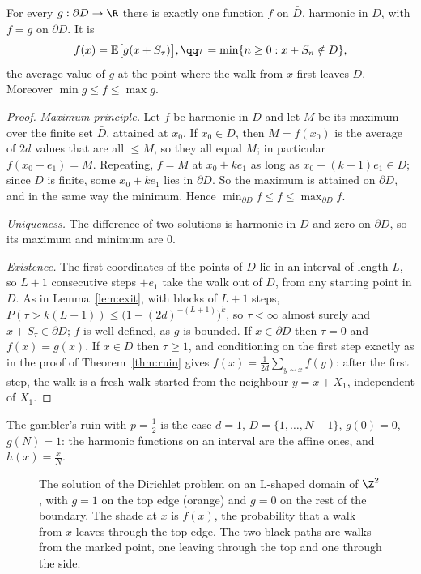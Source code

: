 \begin{theorem}\label{thm:dirichlet}
For every $g:\partial D\to\R$ there is exactly one function $f$ on $\bar D$, harmonic in $D$, with $f=g$ on $\partial D$. It is
\[
\begin{gathered}f(x)=\mathbb E\bigl[g(x+S_\tau)\bigr],\qq\tau=\min\{n\ge0:x+S_n\notin D\},\end{gathered}
\]
the average value of $g$ at the point where the walk from $x$ first leaves $D$. Moreover $\min g\le f\le\max g$.
\end{theorem}
\begin{proof}
\emph{Maximum principle.} Let $f$ be harmonic in $D$ and let $M$ be its maximum over the finite set $\bar D$, attained at $x_0$. If $x_0\in D$,
then $M=f(x_0)$ is the average of $2d$ values that are all $\le M$, so they all equal $M$; in particular $f(x_0+e_1)=M$. Repeating, $f=M$ at
$x_0+ke_1$ as long as $x_0+(k-1)e_1\in D$; since $D$ is finite, some $x_0+ke_1$ lies in $\partial D$. So the maximum is attained on $\partial D$, and in the same way
the minimum. Hence $\min_{\partial D}f\le f\le\max_{\partial D}f$.

\emph{Uniqueness.} The difference of two solutions is harmonic in $D$ and zero on $\partial D$, so its maximum and minimum are $0$.

\emph{Existence.} The first coordinates of the points of $D$ lie in an interval of length $L$, so $L+1$ consecutive steps $+e_1$ take the walk
out of $D$, from any starting point in $D$. As in Lemma~\ref{lem:exit}, with blocks of $L+1$ steps, $P(\tau>k(L+1))\le\bigl(1-(2d)^{-(L+1)}\bigr)^k$, so $\tau<\infty$
almost surely and $x+S_\tau\in\partial D$; $f$ is well defined, as $g$ is bounded. If $x\in\partial D$ then $\tau=0$ and $f(x)=g(x)$. If $x\in D$ then $\tau\ge1$, and
conditioning on the first step exactly as in the proof of Theorem~\ref{thm:ruin} gives $f(x)=\frac1{2d}\sum_{y\sim x}f(y)$: after the first step, the
walk is a fresh walk started from the neighbour $y=x+X_1$, independent of $X_1$.
\end{proof}

The gambler's ruin with $p=\frac12$ is the case $d=1$, $D=\{1,\dots,N-1\}$, $g(0)=0$, $g(N)=1$: the harmonic functions on an interval are
the affine ones, and $h(x)=\frac xN$.

\begin{figure}[ht]
\centering
{}
\caption{The solution of the Dirichlet problem on an L-shaped domain of $\Z^2$, with $g=1$ on the top edge (orange) and
$g=0$ on the rest of the boundary. The shade at $x$ is $f(x)$, the probability that a walk from $x$ leaves through the top
edge. The two black paths are walks from the marked point, one leaving through the top and one through the side.}
\label{fig:dirichlet}
\end{figure}

